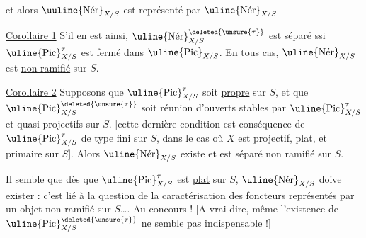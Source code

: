 et alors $\uuline{\operatorname{N\acute{e}r}}_{X/S}$ est représenté par $\uline{\operatorname{N\acute{e}r}}_{X/S}$

\uline{Corollaire 1} S'il en est ainsi, $\uline{\operatorname{N\acute{e}r}}^{\deleted{\unsure{\tau}}}_{X/S}$ est  séparé ssi $\uline{\operatorname{Pic}}^{\tau}_{X/S}$ est fermé dans $\uline{\operatorname{Pic}}_{X/S}$. En tous cas, $\uline{\operatorname{N\acute{e}r}}_{X/S}$ est \uline{non ramifié} sur $S$.

\uline{Corollaire 2} Supposons que $\uline{\operatorname{Pic}}^{\tau}_{X/S}$ soit \uline{propre}  sur $S$, et que $\uline{\operatorname{Pic}}^{\deleted{\unsure{\tau}}}_{X/S}$ soit réunion  d'ouverts  stables par $\uline{\operatorname{Pic}}^{\tau}_{X/S}$ et quasi-projectifs sur $S$. [cette dernière condition est conséquence de $\uline{\operatorname{Pic}}^{\tau}_{X/S}$ de type fini sur $S$, dans le cas où $X$ est projectif, plat, et primaire sur $S$]. Alors $\uline{\operatorname{N\acute{e}r}}_{X/S}$ existe et est séparé non ramifié sur $S$.

Il semble que dès que $\uline{\operatorname{Pic}}^{\tau}_{X/S}$ est \uline{plat}  sur $S$, $\uline{\operatorname{N\acute{e}r}}_{X/S}$ doive exister : c'est lié à la question de la caractérisation des foncteurs représentés par un objet non ramifié sur $S$\ldots. Au concours ! [A vrai dire, même l'existence de $\uline{\operatorname{Pic}}^{\deleted{\unsure{\tau}}}_{X/S}$ ne semble pas indispensable !]
